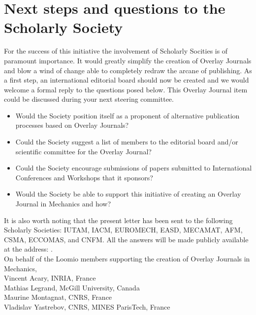 \documentclass[11pt]{article}
\begin{document}
\section*{Next steps and questions to the Scholarly Society}
For the success of this initiative the involvement of Scholarly Socities is of paramount importance. It would greatly simplify the creation of Overlay Journals and blow a wind of change able to completely redraw the arcane of publishing. As a first step, an international editorial board should now be created and we would welcome a formal reply to the questions posed below. This Overlay Journal item could be discussed during your next steering committee.
\begin{itemize}
\item Would the Society position itself as a proponent of alternative publication processes based on Overlay Journals? 
\item Could the Society suggest a list of members to the editorial board and/or scientific committee for the Overlay Journal? 
\item Could the Society encourage submissions of papers submitted to International Conferences and Workshops that it sponsors? 
\item Would the Society be able to support this initiative of creating an Overlay Journal in Mechanics and how?
\end{itemize}
It is also worth noting that the present letter has been sent to the following Scholarly Societies: IUTAM, IACM, EUROMECH, EASD, MECAMAT, AFM, CSMA, ECCOMAS, and CNFM. All the answers will be made publicly available at the address: {\small{}}.\\[5pt]

On behalf of the Loomio members supporting the creation of Overlay Journals in Mechanics, \\[10pt]
Vincent Acary, INRIA, France\\
Mathias Legrand, McGill University, Canada\\
Maurine Montagnat, CNRS, France\\
Vladislav Yastrebov, CNRS, MINES ParisTech, France
\end{document}
